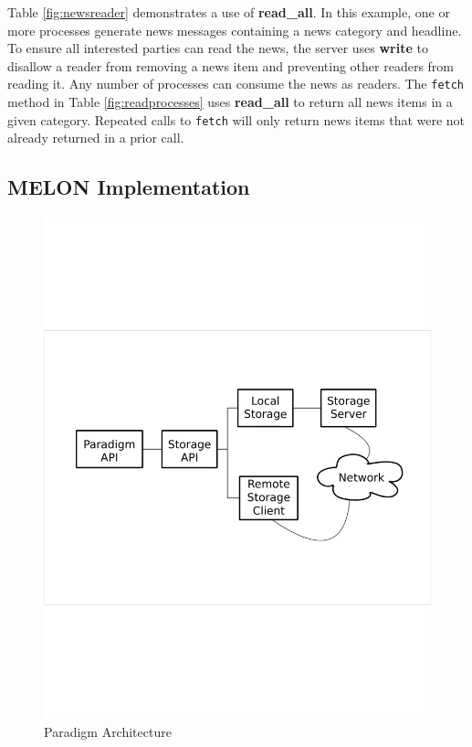 \documentclass[lnicst]{svmultln}
\begin{document}
Table \ref{fig:newsreader} demonstrates a use of \textbf{read\_all}. In this example, one or more processes generate news messages containing a news category and headline. To ensure all interested parties can read the news, the server uses \textbf{write} to disallow a reader from removing a news item and preventing other readers from reading it. Any number of processes can consume the news as readers. The \texttt{fetch} method in Table \ref{fig:readprocesses} uses \textbf{read\_all} to return all news items in a given category. Repeated calls to \texttt{fetch} will only return news items that were not already returned in a prior call.
    
\subsection{MELON Implementation}

\begin{figure}
\centering
\includegraphics[scale = .30, clip, trim = 10px 280px 10px 250px]{figures/paradigm_arch.pdf}
\caption{Paradigm Architecture}
\label{fig:architecture}
\end{figure}
\end{document}
